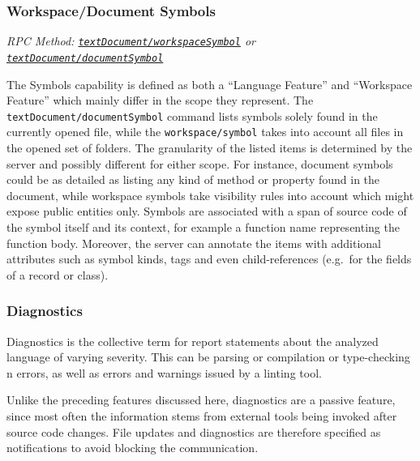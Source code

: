 \documentclass[
  a4paper,
  bibtex,
  english,
  nomenclature]{kthlatex/kththesis/kththesis}
\begin{document}
\hypertarget{sec:workspacedocument-symbols}{%
\subsubsection{Workspace/Document
Symbols}\label{sec:workspacedocument-symbols}}

\emph{RPC Method:
\href{https://microsoft.github.io/language-server-protocol/specifications/lsp/3.17/specification/\#workspace_symbol}{\texttt{textDocument/workspaceSymbol}}
or
\href{https://microsoft.github.io/language-server-protocol/specifications/specification-current/\#textDocument_documentSymbol}{\texttt{textDocument/documentSymbol}}}

The Symbols capability is defined as both a ``Language Feature'' and
``Workspace Feature'' which mainly differ in the scope they represent.
The \texttt{textDocument/documentSymbol} command lists symbols solely
found in the currently opened file, while the \texttt{workspace/symbol}
takes into account all files in the opened set of folders. The
granularity of the listed items is determined by the server and possibly
different for either scope. For instance, document symbols could be as
detailed as listing any kind of method or property found in the
document, while workspace symbols take visibility rules into account
which might expose public entities only. Symbols are associated with a
span of source code of the symbol itself and its context, for example a
function name representing the function body. Moreover, the server can
annotate the items with additional attributes such as symbol kinds, tags
and even child-references (e.g.~for the fields of a record or class).

\hypertarget{sec:diagnostics}{%
\subsubsection{Diagnostics}\label{sec:diagnostics}}

Diagnostics is the collective term for report statements about the
analyzed language of varying severity. This can be parsing or
compilation or type-checking n errors, as well as errors and warnings
issued by a linting tool.

Unlike the preceding features discussed here, diagnostics are a passive
feature, since most often the information stems from external tools
being invoked after source code changes. File updates and diagnostics
are therefore specified as notifications to avoid blocking the
communication.
\end{document}
